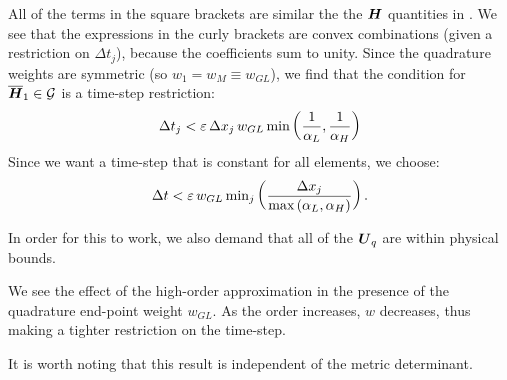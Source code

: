 All of the terms in the square brackets are similar the the $\boldsymbol{H}$ quantities in \citet{Qin2016}. We see that the expressions in the curly brackets are convex combinations (given a restriction on $\Delta t_{j}$), because the coefficients sum to unity. Since the quadrature weights are symmetric (so $w_{1}=w_{M}\equiv w_{GL}$), we find that the condition for $\overline{\boldsymbol{H}}_{1}\in\mathcal{G}$ is a time-step restriction:
\begin{equation}
\Delta t_{j}<\varepsilon\,\Delta x_{j}\,w_{GL}\,\text{min}\left(\frac{1}{\alpha_{L}},\frac{1}{\alpha_{H}}\right)
\end{equation}
Since we want a time-step that is constant for all elements, we choose:
\begin{equation}
\Delta t<\varepsilon\,w_{GL}\,\text{min}_{j}\left(\frac{\Delta x_{j}}{\text{max}\left(\alpha_{L},\alpha_{H}\right)}\right).
\end{equation}

 In order for this to work, we also demand that all of the $\boldsymbol{U}_{q}$ are within physical bounds.

 We see the effect of the high-order approximation in the presence of the quadrature end-point weight $w_{GL}$. As the order increases, $w$ decreases, thus making a tighter restriction on the time-step.

 It is worth noting that this result is independent of the metric determinant.
